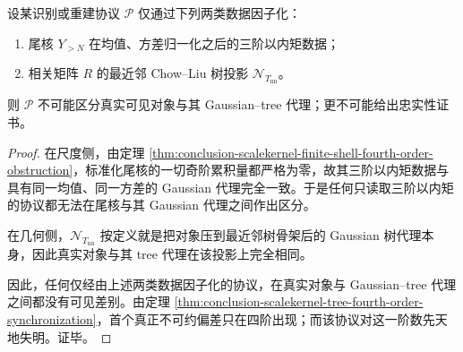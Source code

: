 \begin{theorem}[三阶协议的绝对失明]\label{thm:conclusion-scalekernel-tree-third-order-blindness}
设某识别或重建协议 \(\mathcal P\) 仅通过下列两类数据因子化：
\begin{enumerate}
  \item 尾核 \(Y_{>N}\) 在均值、方差归一化之后的三阶以内矩数据；
  \item 相关矩阵 \(R\) 的最近邻 Chow--Liu 树投影 \(\mathcal N_{T_{\mathrm{nn}}}\)。
\end{enumerate}
则 \(\mathcal P\) 不可能区分真实可见对象与其 Gaussian--tree 代理；更不可能给出忠实性证书。
\end{theorem}
\begin{proof}
在尺度侧，由定理 \ref{thm:conclusion-scalekernel-finite-shell-fourth-order-obstruction}，标准化尾核的一切奇阶累积量都严格为零，故其三阶以内矩数据与具有同一均值、同一方差的 Gaussian 代理完全一致。于是任何只读取三阶以内矩的协议都无法在尾核与其 Gaussian 代理之间作出区分。

在几何侧，\(\mathcal N_{T_{\mathrm{nn}}}\) 按定义就是把对象压到最近邻树骨架后的 Gaussian 树代理本身，因此真实对象与其 tree 代理在该投影上完全相同。

因此，任何仅经由上述两类数据因子化的协议，在真实对象与 Gaussian--tree 代理之间都没有可见差别。由定理 \ref{thm:conclusion-scalekernel-tree-fourth-order-synchronization}，首个真正不可约偏差只在四阶出现；而该协议对这一阶数先天地失明。证毕。
\end{proof}

